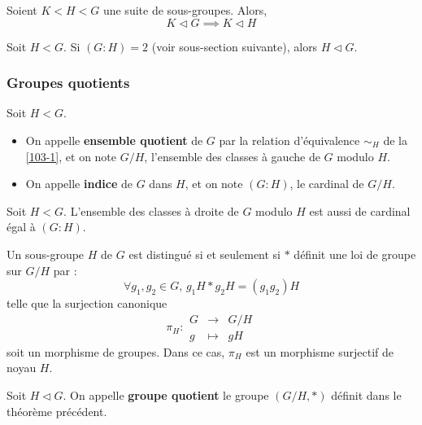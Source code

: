 
  \begin{proposition}
    Soient $K < H < G$ une suite de sous-groupes. Alors,
    \[ K \lhd G \implies K \lhd H \]
  \end{proposition}


  \begin{proposition}
    Soit $H < G$. Si $(G:H) = 2$ (voir sous-section suivante), alors $H \lhd G$.
  \end{proposition}

  \subsubsection{Groupes quotients}

  \begin{definition}
    Soit $H < G$.
    \begin{itemize}
      \item On appelle \textbf{ensemble quotient} de $G$ par la relation d'équivalence $\sim_H$ de la \cref{103-1}, et on note $G/H$, l'ensemble des classes à gauche de $G$ modulo $H$.
      \item On appelle \textbf{indice} de $G$ dans $H$, et on note $(G:H)$, le cardinal de $G/H$.
    \end{itemize}
  \end{definition}

  \begin{proposition}
    Soit $H < G$. L'ensemble des classes à droite de $G$ modulo $H$ est aussi de cardinal égal à $(G:H)$.
  \end{proposition}


  \begin{theorem}
    Un sous-groupe $H$ de $G$ est distingué si et seulement si $*$ définit une loi de groupe sur $G/H$ par :
    \[ \forall g_1, g_2 \in G, \, g_1 H * g_2 H = (g_1 g_2) H \]
    telle que la surjection canonique
    \[
      \pi_H :
      \begin{array}{ccc}
        G &\rightarrow& G/H \\
        g &\mapsto& gH
      \end{array}
    \]
    soit un morphisme de groupes. Dans ce cas, $\pi_H$ est un morphisme surjectif de noyau $H$.
  \end{theorem}

  \begin{definition}
    Soit $H \lhd G$. On appelle \textbf{groupe quotient} le groupe $(G/H, *)$ définit dans le théorème précédent.
  \end{definition}

